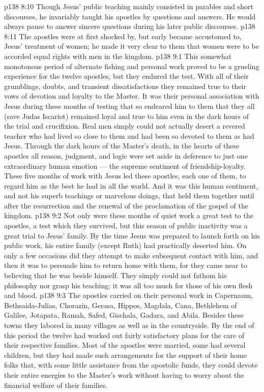 \vs p138 8:10 \pc Though Jesus’ public teaching mainly consisted in parables and short discourses, he invariably taught his apostles by questions and answers. He would always pause to answer sincere questions during his later public discourses.
\vs p138 8:11 The apostles were at first shocked by, but early became accustomed to, Jesus’ treatment of women; he made it very clear to them that women were to be accorded equal rights with men in the kingdom.
\vs p138 9:1 This somewhat monotonous period of alternate fishing and personal work proved to be a grueling experience for the twelve apostles, but they endured the test. With all of their grumblings, doubts, and transient dissatisfactions they remained true to their vows of devotion and loyalty to the Master. It was their personal association with Jesus during these months of testing that so endeared him to them that they all (save Judas Iscariot) remained loyal and true to him even in the dark hours of the trial and crucifixion. Real men simply could not actually desert a revered teacher who had lived so close to them and had been so devoted to them as had Jesus. Through the dark hours of the Master’s death, in the hearts of these apostles all reason, judgment, and logic were set aside in deference to just one extraordinary human emotion --- the supreme sentiment of friendship\hyp{}loyalty. These five months of work with Jesus led these apostles, each one of them, to regard him as the best  he had in all the world. And it was this human sentiment, and not his superb teachings or marvelous doings, that held them together until after the resurrection and the renewal of the proclamation of the gospel of the kingdom.
\vs p138 9:2 Not only were these months of quiet work a great test to the apostles, a test which they survived, but this season of public inactivity was a great trial to Jesus’ family. By the time Jesus was prepared to launch forth on his public work, his entire family (except Ruth) had practically deserted him. On only a few occasions did they attempt to make subsequent contact with him, and then it was to persuade him to return home with them, for they came near to believing that he was beside himself. They simply could not fathom his philosophy nor grasp his teaching; it was all too much for those of his own flesh and blood.
\vs p138 9:3 \pc The apostles carried on their personal work in Capernaum, Bethsaida\hyp{}Julias, Chorazin, Gerasa, Hippos, Magdala, Cana, Bethlehem of Galilee, Jotapata, Ramah, Safed, Gischala, Gadara, and Abila. Besides these towns they labored in many villages as well as in the countryside. By the end of this period the twelve had worked out fairly satisfactory plans for the care of their respective families. Most of the apostles were married, some had several children, but they had made such arrangements for the support of their home folks that, with some little assistance from the apostolic funds, they could devote their entire energies to the Master’s work without having to worry about the financial welfare of their families.
